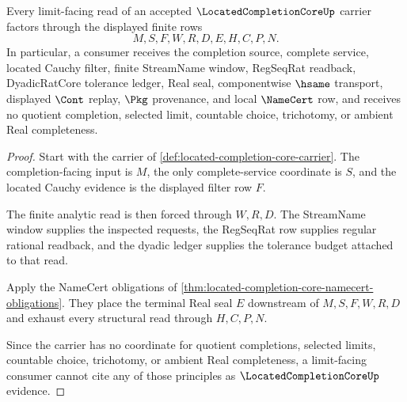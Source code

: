 \begin{theorem}
\label{thm:located-completion-core-choice-free-limit-route}
Every limit-facing read of an accepted $\LocatedCompletionCoreUp$ carrier factors through the displayed finite rows
$$
M,S,F,W,R,D,E,H,C,P,N .
$$
In particular, a consumer receives the completion source, complete service, located Cauchy filter, finite StreamName window, RegSeqRat readback, DyadicRatCore tolerance ledger, Real seal, componentwise $\hsame$ transport, displayed $\Cont$ replay, $\Pkg$ provenance, and local $\NameCert$ row, and receives no quotient completion, selected limit, countable choice, trichotomy, or ambient Real completeness.
\end{theorem}
\begin{proof}
Start with the carrier of \autoref{def:located-completion-core-carrier}. The completion-facing input is $M$, the only complete-service coordinate is $S$, and the located Cauchy evidence is the displayed filter row $F$.

The finite analytic read is then forced through $W,R,D$. The StreamName window supplies the inspected requests, the RegSeqRat row supplies regular rational readback, and the dyadic ledger supplies the tolerance budget attached to that read.

Apply the NameCert obligations of \autoref{thm:located-completion-core-namecert-obligations}. They place the terminal Real seal $E$ downstream of $M,S,F,W,R,D$ and exhaust every structural read through $H,C,P,N$.

Since the carrier has no coordinate for quotient completions, selected limits, countable choice, trichotomy, or ambient Real completeness, a limit-facing consumer cannot cite any of those principles as $\LocatedCompletionCoreUp$ evidence.
\end{proof}



